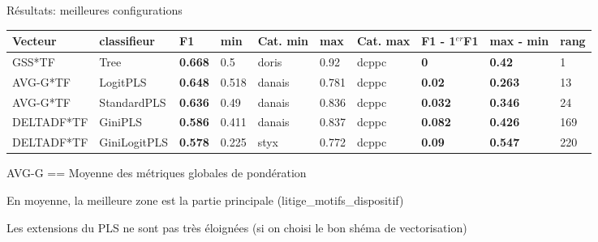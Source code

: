 \begin{frame}{Résultats: meilleures configurations}
\begin{table}[]
\tiny
\label{my-label}
\begin{tabular}{|l|l|l|l|l|l|l|l|l|l|}
\hline
\textbf{Vecteur} & \textbf{classifieur} & \textbf{F1} & \textbf{min} & \textbf{Cat. min} & \textbf{max} & \textbf{Cat. max} & \textbf{F1 - 1$^{er}$F1} & \textbf{max - min} & \textbf{rang} \\ \hline
GSS*TF                 & Tree                & \textbf{0.668}     & 0.5                 & doris                  & 0.92               & dcppc                 & \textbf{0}                    & \textbf{0.42}           & 1             \\ \hline
AVG-G*TF      & LogitPLS         & \textbf{0.648}     & 0.518               & danais                 & 0.781              & dcppc                 & \textbf{0.02}                 & \textbf{0.263}          & 13            \\ \hline
AVG-G*TF      & StandardPLS      & \textbf{0.636}     & 0.49                & danais                 & 0.836              & dcppc                 & \textbf{0.032}                & \textbf{0.346}          & 24            \\ \hline
DELTADF*TF             & GiniPLS          & \textbf{0.586}     & 0.411               & danais                 & 0.837              & dcppc                 & \textbf{0.082}                & \textbf{0.426}          & 169           \\ \hline
DELTADF*TF             & GiniLogitPLS     & \textbf{0.578}     & 0.225               & styx                   & 0.772              & dcppc                 & \textbf{0.09}                 & \textbf{0.547}          & 220           \\ \hline
\end{tabular}
AVG-G == Moyenne des métriques globales de pondération
\end{table}
\scriptsize

En moyenne, la meilleure zone est la partie principale (litige\_motifs\_dispositif)

Les extensions du PLS ne sont pas très éloignées (si on choisi le bon shéma de vectorisation)

\end{frame}

